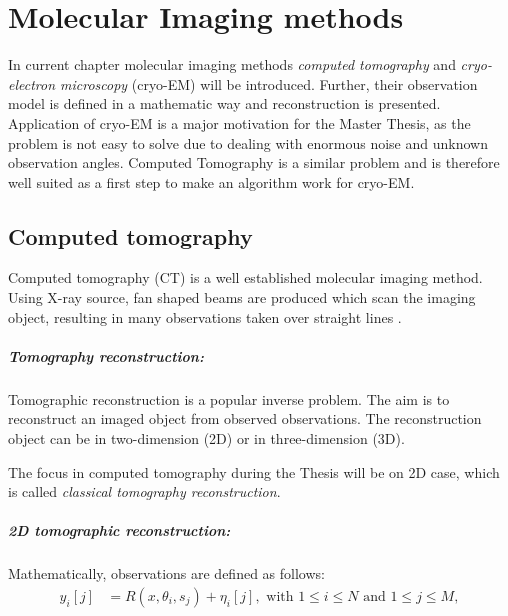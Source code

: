 \chapter{Molecular Imaging methods}
\label{sec:imaging}

In current chapter molecular imaging methods \textit{computed tomography} and 
\textit{cryo-electron microscopy} (cryo-EM) will be introduced. 
Further, their observation model is defined in a mathematic way and reconstruction is presented.
Application of cryo-EM is a major motivation for the Master Thesis, 
as the problem is not easy to solve due to dealing with enormous noise and unknown observation angles.
Computed Tomography is a similar problem and is therefore well suited as a
first step to make an algorithm work for cryo-EM. 


\section{Computed tomography}
Computed tomography (CT) is a well established molecular imaging method.
Using X-ray source, fan shaped beams are produced which scan the imaging object,
resulting in many observations taken over straight lines \cite{computedTomography}.

\paragraph{Tomography reconstruction:}
Tomographic reconstruction \cite{tomographicReconstruction} is a popular inverse problem. 
The aim is to reconstruct an imaged object from observed observations.
The reconstruction object can be in two-dimension (2D) or in three-dimension (3D). 

\begin{tcolorbox}[colback=red!5!white,colframe=red!75!black]
    The focus in computed tomography during the Thesis will be on 2D case, which is called \textit{classical tomography reconstruction}.
\end{tcolorbox}

\paragraph{2D tomographic reconstruction:}

Mathematically, observations are defined as follows:
\begin{equation}
    \label{eq:2Dreconstruction}
    \begin{aligned}
        y_i[j] &= R(x, \theta_i, s_j) + \eta_i[j] , \text{ with } 1 \leq i \leq N \text{ and } 1 \leq j \leq M,
    \end{aligned}
\end{equation}

